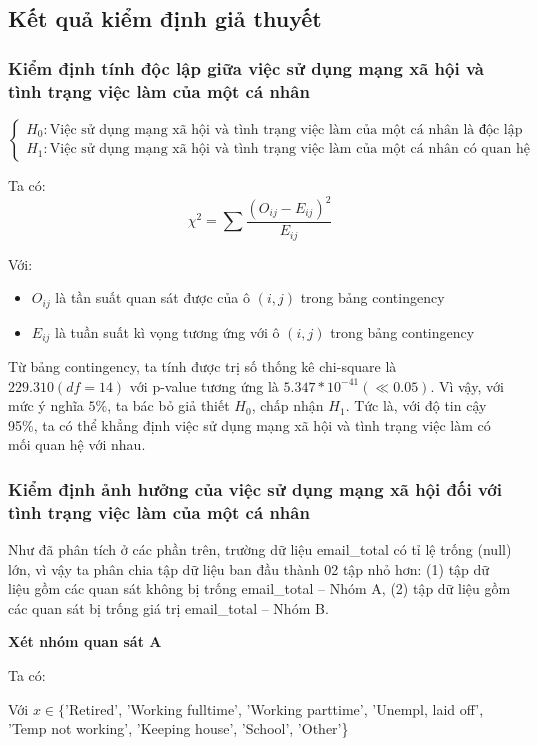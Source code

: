\subsection{Kết quả kiểm định giả thuyết}
\subsubsection{Kiểm định tính độc lập giữa việc sử dụng mạng xã hội và tình trạng việc làm của một cá nhân}
$$
\left\{\begin{array}{l}
H_{0}: \text{Việc sử dụng mạng xã hội và tình trạng việc làm của một cá nhân là độc lập với nhau}\\
H_{1}: \text{Việc sử dụng mạng xã hội và tình trạng việc làm của một cá nhân có quan hệ với nhau}
\end{array}\right.
$$

Ta có:
$$
\chi^{2}=\sum \frac{\left(O_{i j}-E_{i j}\right)^{2}}{E_{i j}}
$$

Với:
\begin{itemize}
    \item $O_{i j}$ là tần suất quan sát được của ô $(i, j)$ trong bảng contingency
    \item $E_{i j}$ là tuần suất kì vọng tương ứng với ô $(i, j)$ trong bảng contingency
\end{itemize}

Từ bảng contingency, ta tính được trị số thống kê chi-square là $229.310(df=14)$ với p-value tương ứng là $5.347 * 10^{-41}(\ll 0.05)$. Vì vậy, với mức ý nghĩa $5 \%$, ta bác bỏ giả thiết $H_{0}$, chấp nhận $H_{1}$. Tức là, với độ tin cậy 95\%, ta có thể khẳng định việc sử dụng mạng xã hội và tình trạng việc làm có mối quan hệ với nhau.

\subsubsection{Kiểm định ảnh hưởng của việc sử dụng mạng xã hội đối với tình trạng việc làm của một cá nhân}
Như đã phân tích ở các phần trên, trường dữ liệu email\_total có tỉ lệ trống (null) lớn, vì vậy ta phân chia tập dữ liệu ban đầu thành 02 tập nhỏ hơn: (1) tập dữ liệu gồm các quan sát không bị trống email\_total – Nhóm A, (2) tập dữ liệu gồm các quan sát bị trống giá trị email\_total – Nhóm B.

\textbf{Xét nhóm quan sát A}

Ta có:


Với $x \in\{$'Retired', 'Working fulltime', 'Working parttime', 'Unempl, laid off', 'Temp not working', 'Keeping house', 'School', 'Other'\}

